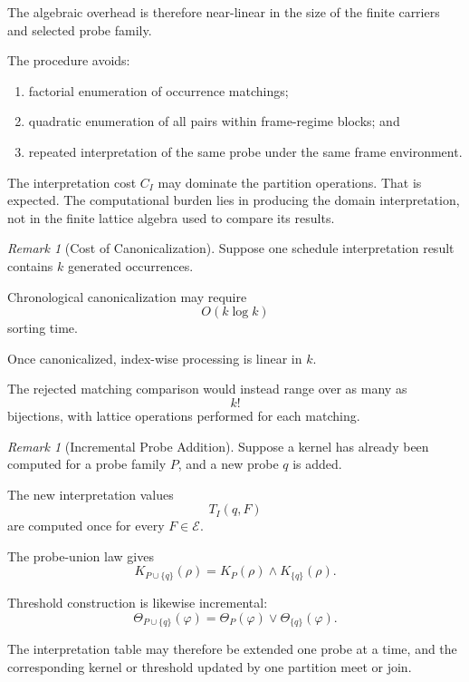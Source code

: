 \documentclass[11pt]{article}
\theoremstyle{plain}
\theoremstyle{definition}
\theoremstyle{remark}
\newtheorem{remark}[theorem]{Remark}
\begin{document}
The algebraic overhead is therefore near-linear
in the size of the finite carriers
and selected probe family.

The procedure avoids:

\begin{enumerate}[label=(\alph*)]
  \item factorial enumeration of occurrence matchings;
  \item quadratic enumeration of all pairs
        within frame-regime blocks; and
  \item repeated interpretation of the same probe
        under the same frame environment.
\end{enumerate}

The interpretation cost \(C_I\)
may dominate the partition operations.
That is expected.
The computational burden lies
in producing the domain interpretation,
not in the finite lattice algebra
used to compare its results.

\begin{remark}[Cost of Canonicalization]
  \label{ik.rem.canonicalization-cost}
  Suppose one schedule interpretation result
  contains \(k\) generated occurrences.

  Chronological canonicalization
  may require
  \[
    O(k\log k)
  \]
  sorting time.

  Once canonicalized,
  index-wise processing is linear in \(k\).

  The rejected matching comparison
  would instead range over
  as many as
  \[
    k!
  \]
  bijections,
  with lattice operations performed
  for each matching.
\end{remark}

\begin{remark}[Incremental Probe Addition]
  \label{ik.rem.incremental-probes}
  Suppose a kernel has already been computed
  for a probe family \(P\),
  and a new probe \(q\) is added.

  The new interpretation values
  \[
    T_I(q,F)
  \]
  are computed once for every
  \(F\in\mathcal{E}\).

  The probe-union law gives
  \[
    K_{P\cup\{q\}}(\rho)
    =
    K_P(\rho)
    \wedge
    K_{\{q\}}(\rho).
  \]

  Threshold construction is likewise incremental:
  \[
    \Theta_{P\cup\{q\}}(\varphi)
    =
    \Theta_P(\varphi)
    \vee
    \Theta_{\{q\}}(\varphi).
  \]
\end{remark}

The interpretation table may therefore be extended
one probe at a time,
and the corresponding kernel or threshold
updated by one partition meet or join.
\end{document}
